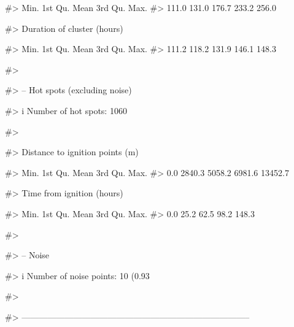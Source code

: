 \begin{Schunk}
\begin{Soutput}
#>         Min.     1st Qu.        Mean     3rd Qu.        Max.
#>        111.0       131.0       176.7       233.2       256.0
\end{Soutput}
\begin{Soutput}
#> Duration of cluster (hours)
\end{Soutput}
\begin{Soutput}
#>         Min.     1st Qu.        Mean     3rd Qu.        Max.
#>        111.2       118.2       131.9       146.1       148.3
\end{Soutput}
\begin{Soutput}
#> 
\end{Soutput}
\begin{Soutput}
#> -- Hot spots (excluding noise)
\end{Soutput}
\begin{Soutput}
#> i Number of hot spots: 1060
\end{Soutput}
\begin{Soutput}
#> 
\end{Soutput}
\begin{Soutput}
#> Distance to ignition points (m)
\end{Soutput}
\begin{Soutput}
#>         Min.     1st Qu.        Mean     3rd Qu.        Max.
#>          0.0      2840.3      5058.2      6981.6     13452.7
\end{Soutput}
\begin{Soutput}
#> Time from ignition (hours)
\end{Soutput}
\begin{Soutput}
#>         Min.     1st Qu.        Mean     3rd Qu.        Max.
#>          0.0        25.2        62.5        98.2       148.3
\end{Soutput}
\begin{Soutput}
#> 
\end{Soutput}
\begin{Soutput}
#> -- Noise
\end{Soutput}
\begin{Soutput}
#> i Number of noise points: 10 (0.93 %
\end{Soutput}
\begin{Soutput}
#> 
\end{Soutput}
\begin{Soutput}
#> --------------------------------------------------------------------------------
\end{Soutput}
\end{Schunk}

